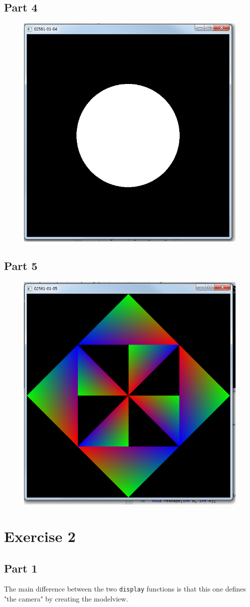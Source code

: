 \documentclass[11pt]{article}
\begin{document}
\subsection{Part 4}
\begin{figure}[H]
	\centering
	\includegraphics[width=0.5\linewidth]{images/e01p4}
	\label{fig:e01p4}
\end{figure}

\subsection{Part 5}
\begin{figure}[H]
	\centering
	\includegraphics[width=0.5\linewidth]{images/e01p5}
	\label{fig:e01p5}
\end{figure}




\section{Exercise 2}
\subsection{Part 1}
The main difference between the two \texttt{display} functions is that this one defines "the camera" by creating the modelview.\\
\end{document}

